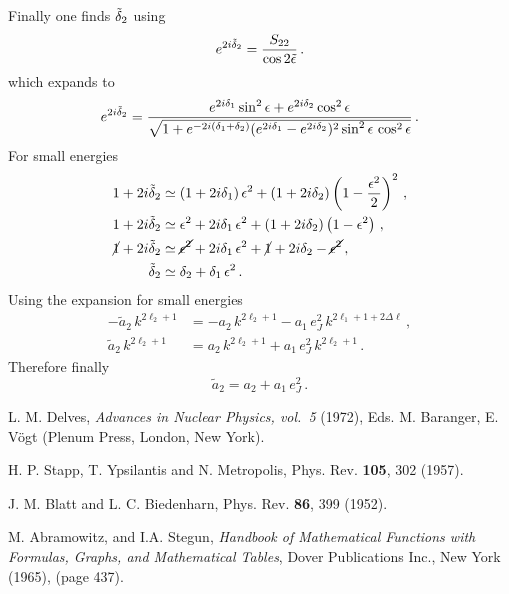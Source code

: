 \documentclass[10pt,a4paper]{article}
\begin{document}
\begin{appendices}
		Finally one finds $\tilde{\delta}_2$ using
		\begin{equation}
			e^{2i\tilde{\delta}_2} = \frac{S_{22}}{\cos2\tilde{\epsilon}}\,.
		\end{equation}
		which expands to
		\begin{equation}
			e^{2i\tilde{\delta}_2} =
			\frac{
				e^{2i\delta_1}\sin^2\epsilon
				+
				e^{2i\delta_2}\cos^2\epsilon
			}{
				\sqrt{
					1
					+
					e^{-2i(\delta_1+\delta_2)}
					(e^{2i\delta_1}-e^{2i\delta_2})^2\sin^2\epsilon\,\cos^2\epsilon}
			}\,.
		\end{equation}
		For small energies
		\begin{align}
			1+2i\tilde{\delta}_2 &\simeq
			(1+2i\delta_1)\,\epsilon^2
			+
			(1+2i\delta_2)
			\left(	
				1-\dfrac{\epsilon^2}{2}
			\right)^2
			\,,\\
			1+2i\tilde{\delta}_2 &\simeq
			\epsilon^2+2i\delta_1\,\epsilon^2
			+
			(1+2i\delta_2)
			\left(	
			1-\epsilon^2
			\right)
			\,,\\
			\cancel{1}+2i\tilde{\delta}_2 &\simeq
			\cancel{\epsilon^2}+2i\delta_1\,\epsilon^2
			+
			\cancel{1}+2i\delta_2-\cancel{\epsilon^2}
			\,,\\
			\tilde{\delta}_2 &\simeq \delta_2 + \delta_1\,\epsilon^2\,.
		\end{align}
		Using the expansion for small energies
		\begin{align}
			-\tilde{a}_2\,k^{2\ell_2+1}
			&=
			-a_2\,k^{2\ell_2+1}
			-
			a_1\,e_J^2\,
			k^{2\ell_1+1+2\Delta\ell}\,,\\
			\tilde{a}_2\,k^{2\ell_2+1}
			&=
			a_2\,k^{2\ell_2+1}
			+
			a_1\,e_J^2\,
			k^{2\ell_2+1}\,.
		\end{align}
		Therefore finally
		\begin{equation}
			\tilde{a}_2 = a_2+a_1\,e_J^2\,.
		\end{equation}
		
		
		
		
	\end{appendices}
	
	\begin{thebibliography}{9}
		L. M. Delves, \textit{Advances in Nuclear Physics, vol.~5} (1972), Eds. M. Baranger, E. V\"ogt (Plenum Press, London, New York).
		
		H. P. Stapp, T. Ypsilantis and N. Metropolis, Phys. Rev. \textbf{105}, 302 (1957).
		
		J. M. Blatt and L. C. Biedenharn, Phys. Rev. \textbf{86}, 399 (1952).
		
		M. Abramowitz, and I.A. Stegun, \textit{Handbook of Mathematical Functions with Formulas, Graphs, and Mathematical Tables}, Dover Publications Inc., New York (1965), (page 437).
		
		
	\end{thebibliography}
	
\end{document}

